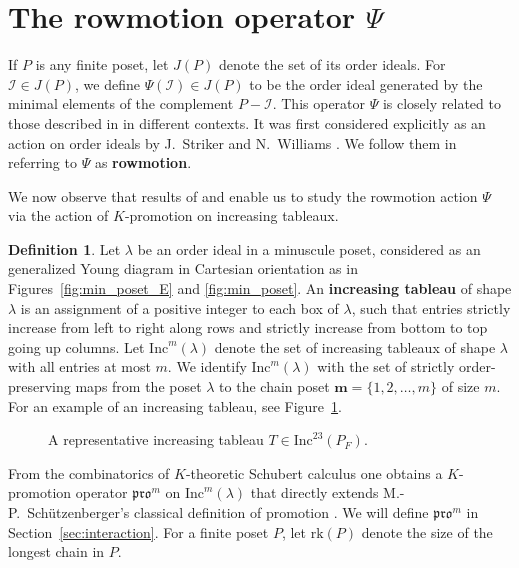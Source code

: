 \documentclass[12pt]{amsart}
\theoremstyle{definition}
\newtheorem{definition}[theorem]{Definition}
\theoremstyle{remark}
\numberwithin{equation}{section}
\newcommand{\inc}{\ensuremath{\mathrm{Inc}}}
\newcommand{\pro}{\mathfrak{pro}}
\newcommand{\rank}{\ensuremath{\mathrm{rk}}}
\newcommand{\uu}{\mathcal{I}}
\begin{document}
\section{The rowmotion operator $\Psi$}\label{sec:rowmotion}

If $P$ is any finite poset, let $J(P)$ denote the set of its order ideals. For $\uu \in J(P)$, we define $\Psi(\uu) \in J(P)$ to be the order ideal generated by the minimal elements of the complement $P - \uu$. This operator $\Psi$ is closely related to those described in \cite{Brouwer.Schrijver,Duchet,Cameron.Fonderflaass} in different contexts. It was first considered explicitly as an action on order ideals by J.~Striker and N.~Williams \cite{Striker.Williams}. We follow them in referring to $\Psi$ as {\bf rowmotion}.

We now observe that results of \cite{DPS} and \cite{Dilks.Striker.Vorland} enable us to study the rowmotion action $\Psi$ via the action of $K$-promotion on increasing tableaux.

\begin{definition}
Let $\lambda$ be an order ideal in a minuscule poset, considered as an generalized Young diagram in Cartesian orientation as in Figures~\ref{fig:min_poset_E} and \ref{fig:min_poset}. An {\bf increasing tableau} of shape $\lambda$ is an assignment of a positive integer to each box of $\lambda$, such that entries strictly increase from left to right along rows and strictly increase from bottom to top going up columns. Let $\inc^m(\lambda)$ denote the set of increasing tableaux of shape $\lambda$ with all entries at most $m$. We identify $\inc^m(\lambda)$ with the set of strictly order-preserving maps from the poset $\lambda$ to the chain poset $\mathbf{m} = \{1, 2, \dots, m\}$ of size $m$. For an example of an increasing tableau, see Figure~\ref{fig:inctab}.
\end{definition}

\begin{figure}[h]
\caption{A representative increasing tableau $T \in \inc^{23}(P_F)$.}\label{fig:inctab}
\end{figure}

From the combinatorics of $K$-theoretic Schubert calculus one obtains a $K$-promotion operator $\pro^m$ on $\inc^m(\lambda)$ that directly extends M.-P.~Sch\"utzenberger's classical definition of promotion \cite{Schutzenberger:promotion}. We will define $\pro^m$ in Section~\ref{sec:interaction}. For a finite poset $P$, let $\rank(P)$ denote the size of the longest chain in $P$.
\end{document}

